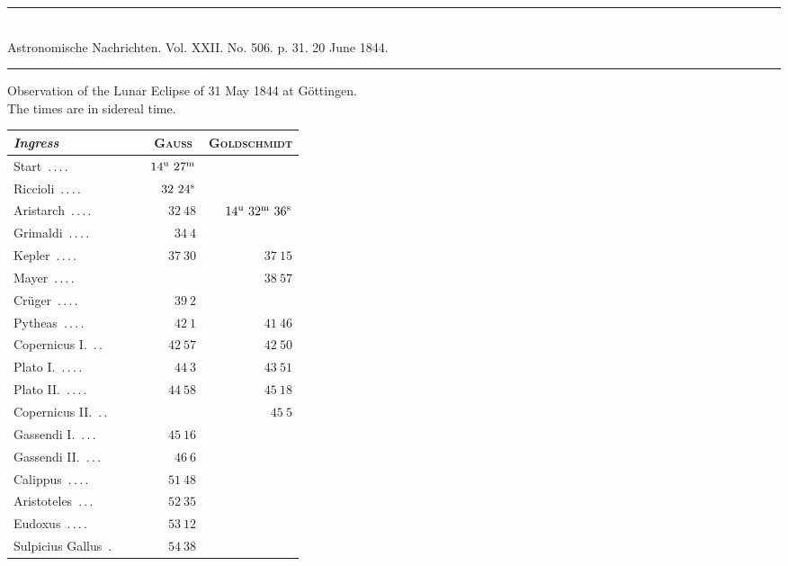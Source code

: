 \clearpage
{}
\begin{center}
\rule{0.55\linewidth}{0.4pt}\\[2pt]
Astronomische Nachrichten. Vol. XXII. No. 506. p. 31. 20 June 1844.\\[2pt]
\rule{0.55\linewidth}{0.4pt}
\end{center}
\begin{center}
Observation of the Lunar Eclipse of 31 May 1844 at Göttingen.\\
The times are in sidereal time.
\end{center}

\begin{center}\begingroup\fontsize{10}{12}\selectfont\setlength{\tabcolsep}{5pt}
\begin{tabular}{@{}p{0.47\linewidth}|r|r@{}}
\emph{Ingress} & \multicolumn{1}{c|}{\textsc{Gauss}} & \multicolumn{1}{c}{\textsc{Goldschmidt}}\\\hline
Start\ \mbox{.\,.\,.\,.} & $14^{\rm u}\ 27^{\rm m}$ & \\
Riccioli\ \mbox{.\,.\,.\,.} & $32\ 24^{\rm s}$ & \\
Aristarch\ \mbox{.\,.\,.\,.} & $32\ 48$ & $14^{\rm u}\ 32^{\rm m}\ 36^{\rm s}$\\
Grimaldi\ \mbox{.\,.\,.\,.} & $34\ 4$ & \\
Kepler\ \mbox{.\,.\,.\,.} & $37\ 30$ & $37\ 15$\\
Mayer\ \mbox{.\,.\,.\,.} &  & $38\ 57$\\
Crüger\ \mbox{.\,.\,.\,.} & $39\ 2$ & \\
Pytheas\ \mbox{.\,.\,.\,.} & $42\ 1$ & $41\ 46$\\
Copernicus I.\ \mbox{.\,.} & $42\ 57$ & $42\ 50$\\
Plato I.\ \mbox{.\,.\,.\,.} & $44\ 3$ & $43\ 51$\\
Plato II.\ \mbox{.\,.\,.\,.} & $44\ 58$ & $45\ 18$\\
Copernicus II.\ \mbox{.\,.} &  & $45\ 5$\\
Gassendi I.\ \mbox{.\,.\,.} & $45\ 16$ & \\
Gassendi II.\ \mbox{.\,.\,.} & $46\ 6$ & \\
Calippus\ \mbox{.\,.\,.\,.} & $51\ 48$ & \\
Aristoteles\ \mbox{.\,.\,.} & $52\ 35$ & \\
Eudoxus\ \mbox{.\,.\,.\,.} & $53\ 12$ & \\
Sulpicius Gallus\ \mbox{.} & $54\ 38$ & \\

\end{tabular}
\end{center}

